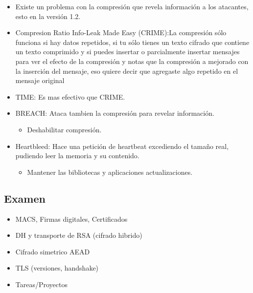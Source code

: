 \documentclass[11pt]{article}
\begin{document}
\begin{itemize}
\item Existe un problema con la compresión que revela información a los atacantes, esto en la versión 1.2.

\item Compresion Ratio Info-Leak Made Easy (CRIME):La compresión sólo funciona si hay datos repetidos, si tu sólo tienes un texto cifrado que contiene un texto comprimido y si puedes insertar o parcialmente insertar mensajes para ver el efecto de la compresión y notas que la compresión a mejorado con la inserción del mensaje, eso quiere decir que agregaste algo repetido en el mensaje original
\item TIME: Es mas efectivo que CRIME.
\item BREACH: Ataca tambien la compresión para revelar información.
\begin{itemize}
\item Deshabilitar compresión.
\end{itemize}

\item Heartbleed: Hace una petición de heartbeat excediendo el tamaño real, pudiendo leer la memoria y su contenido.
\begin{itemize}
\item Mantener las bibliotecas y aplicaciones actualizaciones.
\end{itemize}
\end{itemize}
\subsection{Examen}
\label{sec:orgbfb29b6}
\begin{itemize}
\item MACS, Firmas digitales, Certificados
\item DH y transporte de RSA (cifrado hibrido)
\item Cifrado simetrico AEAD
\item TLS (versiones, handshake)
\item Tareas/Proyectos
\end{itemize}
\end{document}
